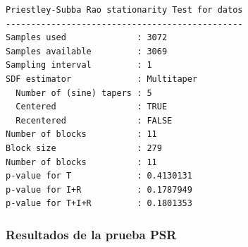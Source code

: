\documentclass[11pt]{beamer}
\begin{document}
\begin{lrbox}{\caja}%
\begin{lstlisting}[caption={}]
Priestley-Subba Rao stationarity Test for datos
-----------------------------------------------
Samples used              : 3072 
Samples available         : 3069 
Sampling interval         : 1 
SDF estimator             : Multitaper 
  Number of (sine) tapers : 5 
  Centered                : TRUE 
  Recentered              : FALSE 
Number of blocks          : 11 
Block size                : 279 
Number of blocks          : 11 
p-value for T             : 0.4130131 
p-value for I+R           : 0.1787949 
p-value for T+I+R         : 0.1801353 
\end{lstlisting}
\end{lrbox}%


\begin{frame}[fragile]\frametitle{Resultados de la prueba PSR}
\begin{figure}
\scalebox{0.7}{\usebox{\caja}}
\end{figure}
\end{frame}

%
%



\end{document}
